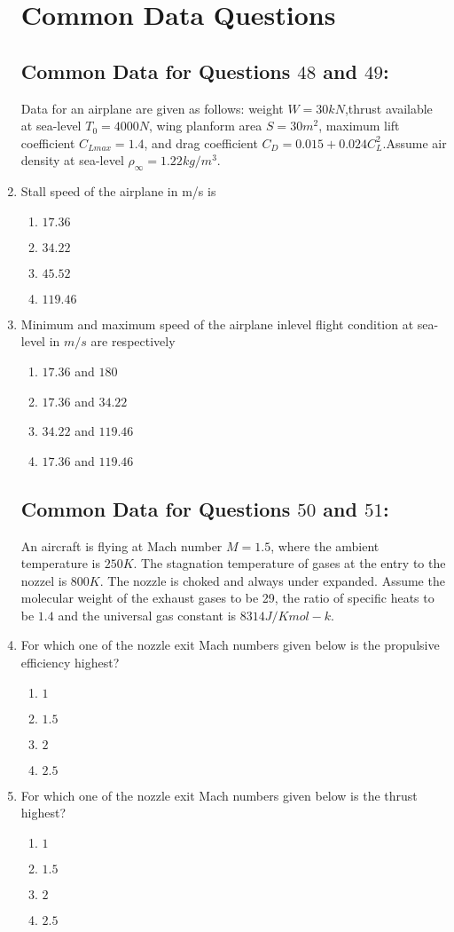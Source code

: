 \documentclass[journal,12pt,onecolumn]{IEEEtran}
\theoremstyle{remark}
\begin{document}
\begin{enumerate}[start=40]
	\section*{Common Data Questions}
	\subsection*{Common Data for Questions $48$ and $49$:}Data for an airplane are given as follows: weight $W=30kN$,thrust available at sea-level $T_0=4000 N$, wing planform area $S=30 m^2$, maximum lift coefficient $C_{Lmax}=1.4$, and drag coefficient $C_D=0.015+0.024 C_L^2$.Assume air density at sea-level $\rho_{\infty} = 1.22 kg/m^3.$\\
\item Stall speed of the airplane in m/s is
	\begin{enumerate}
		\item $17.36$ \item $34.22$ 
		\item $45.52$ \item $119.46$
	\end{enumerate}
\item Minimum and maximum speed of the airplane inlevel flight condition at sea-level in $m/s$ are respectively
	\begin{enumerate}
		\item $17.36$ and $180$
		\item $17.36$ and $34.22$
		\item $34.22$ and $119.46$
		\item $17.36$ and $119.46$
	\end{enumerate}
\subsection*{Common Data for Questions $50$ and $51$:} An aircraft is flying at Mach number $M=1.5$, where the ambient temperature is $250 K$. The stagnation temperature of gases at the entry to the nozzel is $800 K$. The nozzle is choked and always under expanded. Assume the molecular weight of the exhaust gases to be 29, the ratio of specific heats to be $1.4$ and the universal gas constant is $8314 J/Kmol-k.$
\item For which one of the nozzle exit Mach numbers given below is the propulsive efficiency highest?
	\begin{enumerate}
		\item $1$ \item $1.5$\item $2$\item $2.5$
	\end{enumerate}
\item For which one of the nozzle exit Mach numbers given below is the thrust highest?
        \begin{enumerate}
                \item $1$ \item $1.5$\item $2$\item $2.5$
        \end{enumerate}

\end{enumerate}
\end{document}
